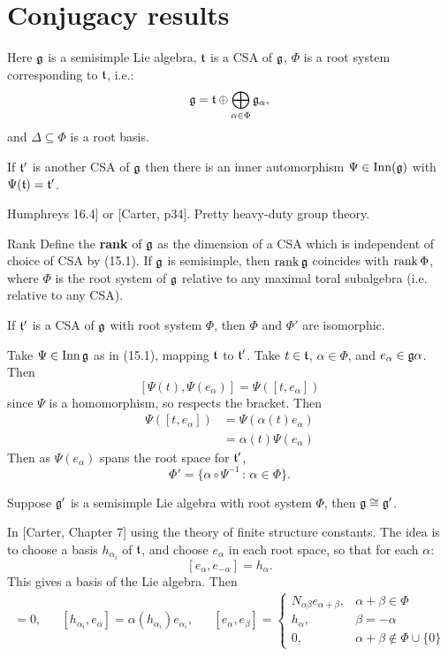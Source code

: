 \documentclass{article}
\begin{document}
\section{Conjugacy results}
Here $\mathfrak{g}$ is a semisimple Lie algebra, $\mathfrak{t}$ is a CSA of $\mathfrak{g}$, $\Phi$ is a root system corresponding to $\mathfrak{t}$, i.e.:
\[ \mathfrak{g} = \mathfrak{t} \oplus \bigoplus_{\alpha \in \Phi} \mathfrak{g}_{\alpha},\] and $\Delta \subseteq \Phi$ is a root basis.
\begin{fancylem}{}
    If $\mathfrak{t}'$ is another CSA of $\mathfrak{g}$ then there is an inner automorphism $\Psi \in \operatorname{Inn}(\mathfrak{g})$ with $\Psi(\mathfrak{t}) = \mathfrak{t}'$.
\end{fancylem}
\proof {[}Humphreys 16.4{]} or [Carter, p34]. Pretty heavy-duty group theory. \endproof
\begin{fancydefine*}{Rank}
    Define the \textbf{rank} of $\mathfrak{g}$ as the dimension of a CSA which is independent of choice of CSA by (15.1). If $\mathfrak{g}$ is semisimple, then $\rank \mathfrak{g}$ coincides with $\rank \Phi$,  where $\Phi$ is the root system of $\mathfrak{g}$ relative to any maximal toral subalgebra (i.e. relative to any CSA).
\end{fancydefine*}

\begin{fancylem}{}
    If $\mathfrak{t}'$ is a CSA of $\mathfrak{g}$ with root system $\Phi$, then $\Phi$ and $\Phi'$ are isomorphic.
\end{fancylem}
\proof Take $\Psi \in \operatorname{Inn} \mathfrak{g}$ as in (15.1), mapping $\mathfrak{t}$ to $\mathfrak{t}'$. Take $t \in \mathfrak{t}$, $\alpha \in \Phi$, and $e_{\alpha} \in \mathfrak{g}{\alpha}$. Then \[ [\Psi(t), \Psi(e_{\alpha})]=\Psi([t,e_{\alpha}])\]
since $\Psi$ is a homomorphism, so respects the bracket. Then \begin{align*}
    \Psi([t,e_{\alpha}]) &= \Psi(\alpha(t)e_{\alpha})\\
    &= \alpha(t)\Psi(e_{\alpha})
\end{align*}
Then as $\Psi(e_{\alpha})$ spans the root space for $\mathfrak{t}'$, \[ \Phi' = \{ \alpha \circ \Psi^{-1} \, : \, \alpha \in \Phi\}.\] \endproof 
\begin{fancythm}{}
    Suppose $\mathfrak{g}'$ is a semisimple Lie algebra with root system $\Phi$, then $\mathfrak{g} \cong \mathfrak{g}'$.
\end{fancythm}
\proof In [Carter, Chapter 7] using the theory of finite structure constants. The idea is to choose a basis $h_{\alpha_{i}}$ of $\mathfrak{t}$, and choose $e_{\alpha}$ in each root space, so that for each $\alpha$: \[ [e_{\alpha}, e_{-\alpha}]=h_{\alpha}. \] This gives a basis of the Lie algebra. Then \begin{align*}
    [h_{\alpha_{i}},h_{\alpha_{j}}] =0, & & [h_{\alpha_{i}}, e_{\alpha}] = \alpha(h_{\alpha_{i}})e_{\alpha_{i}}, & & [e_{\alpha},e_{\beta}] = \begin{cases}
        N_{\alpha \beta} e_{\alpha + \beta}, & \alpha+\beta \in \Phi\\
        h_{\alpha}, & \beta = -\alpha\\
        0, & \alpha + \beta \notin \Phi \cup \{0\}
    \end{cases}
\end{align*}
\end{document}
